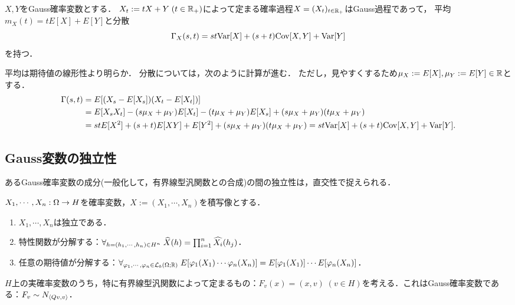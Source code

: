 \documentclass[uplatex,dvipdfmx]{jsreport}
\begin{document}
\begin{lemma}[共分散公式]
    $X,Y$をGauss確率変数とする．
    $X_t:=tX+Y\;(t\in\mathbb{R}_+)$によって定まる確率過程$X=(X_t)_{t\in\mathbb{R}_+}$はGauss過程であって，
    平均$m_X(t)=tE[X]+E[Y]$と分散
    \[\Gamma_X(s,t)=st\mathrm{Var}[X]+(s+t)\mathrm{Cov}[X,Y]+\mathrm{Var}[Y]\]
    を持つ．
\end{lemma}
\begin{Proof}
    平均は期待値の線形性より明らか．
    分散については，次のように計算が進む．
    ただし，見やすくするため$\mu_X:=E[X],\mu_Y:=E[Y]\in\mathbb{R}$とする．
    \begin{align*}
        \Gamma(s,t)&=E[(X_s-E[X_s])(X_t-E[X_t])]\\
        &=E[X_sX_t]-(s\mu_X+\mu_Y)E[X_t]-(t\mu_X+\mu_Y)E[X_s]+(s\mu_X+\mu_Y)(t\mu_X+\mu_Y)\\
        &=stE[X^2]+(s+t)E[XY]+E[Y^2]+(s\mu_X+\mu_Y)(t\mu_X+\mu_Y)=st\mathrm{Var}[X]+(s+t)\mathrm{Cov}[X,Y]+\mathrm{Var}[Y].
    \end{align*}
\end{Proof}

\subsection{Gauss変数の独立性}

\begin{tcolorbox}[colframe=ForestGreen, colback=ForestGreen!10!white,breakable,colbacktitle=ForestGreen!40!white,coltitle=black,fonttitle=\bfseries\sffamily,
title=]
    あるGauss確率変数の成分(一般化して，有界線型汎関数との合成)の間の独立性は，直交性で捉えられる．
\end{tcolorbox}

\begin{proposition}[一般の確率変数の独立性の特徴付け]
    $X_1,\cdots,X_n:\Omega\to H$を確率変数，$X:=(X_1,\cdots,X_n)$を積写像とする．
    \begin{enumerate}
        \item $X_1,\cdots,X_n$は独立である．
        \item 特性関数が分解する：$\forall_{h=(h_1,\cdots,h_n)\in H^n}\;\widehat{X}(h)=\prod_{i=1}^n\widehat{X_i}(h_j)$．
        \item 任意の期待値が分解する：$\forall_{\varphi_1,\cdots,\varphi_n\in\mathcal{L}_b(\Omega;\mathbb{R})}\;E[\varphi_1(X_1)\cdots\varphi_n(X_n)]=E[\varphi_1(X_1)]\cdots E[\varphi_n(X_n)]$．
    \end{enumerate}
\end{proposition}

\begin{notation}[正規Hilbert空間上の線型な実確率変数]
    $H$上の実確率変数のうち，特に有界線型汎関数によって定まるもの：$F_v(x)=(x,v)\;(v\in H)$を考える．これはGauss確率変数である：$F_v\sim N_{\langle Qv,v\rangle}$．
\end{notation}
\end{document}
